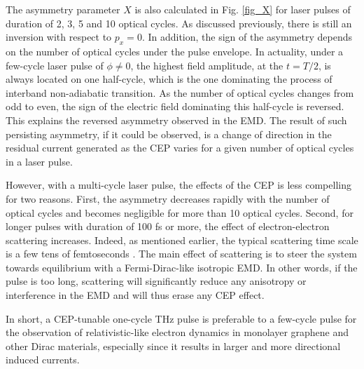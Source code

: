 \documentclass[9pt,twocolumn,twoside]{osajnl}
\begin{document}
  The asymmetry parameter $X$ is also calculated in Fig. \ref{fig_X} for laser pulses of duration of 2, 3, 5 and 10 optical cycles. As discussed previously, there is still an  inversion with respect to $p_x=0$. In addition, the sign of the asymmetry depends on the number of optical cycles under the pulse envelope. In actuality, under a few-cycle laser pulse of $\phi\ne0$, the highest field amplitude, at the $t=T/2$, is always located on one half-cycle, which is the one dominating the process of  interband non-adiabatic transition. As the number of optical cycles changes from odd to even, the sign of the electric field dominating this half-cycle is reversed. This explains the reversed asymmetry observed in the EMD. The result of such persisting asymmetry, if it could be observed, is a change of direction in the residual current generated as the CEP varies for a given number of optical cycles in a laser pulse.
  
   
  However, with  a multi-cycle laser pulse, the effects of the CEP is less compelling for two reasons. First, the asymmetry decreases rapidly with the number of optical cycles and becomes negligible for more than 10 optical cycles. Second, for longer pulses with duration of 100 fs or more, the effect of electron-electron scattering increases. Indeed, as mentioned earlier, the typical scattering time scale is a few tens of femtoseconds \cite{ANDP:ANDP201700038}. The main effect of scattering is to steer the system towards equilibrium with a Fermi-Dirac-like isotropic EMD. In other words, if the pulse is too long, scattering will significantly reduce any anisotropy or interference in the EMD and will thus erase any CEP effect.

 In short, a CEP-tunable one-cycle THz pulse is preferable to a few-cycle pulse for the observation of relativistic-like electron dynamics in monolayer graphene and other Dirac materials, especially since it results in larger and more directional induced currents.
 
 
\end{document}
